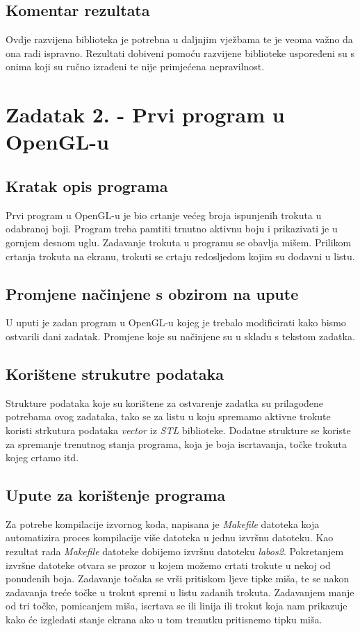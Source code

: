 \documentclass{report}
\begin{document}
\subsection{Komentar rezultata}
Ovdje razvijena biblioteka je potrebna u daljnjim vježbama te je veoma važno da ona radi ispravno.  Rezultati dobiveni pomoću razvijene biblioteke uspoređeni su s onima koji su ručno izrađeni te nije primjećena nepravilnost.
 
\section{Zadatak 2. - Prvi program u OpenGL-u}
\subsection{Kratak opis programa}
Prvi program u OpenGL-u je bio crtanje većeg broja ispunjenih trokuta u odabranoj boji. Program treba pamtiti trnutno aktivnu boju i prikazivati je u gornjem desnom uglu. Zadavanje trokuta u programu se obavlja mišem. Prilikom crtanja trokuta na ekranu, trokuti se crtaju redosljedom kojim su dodavni u listu.

\subsection{Promjene načinjene s obzirom na upute}
U uputi je zadan program u OpenGL-u kojeg je trebalo modificirati kako bismo ostvarili dani zadatak. Promjene koje su načinjene su u skladu s tekstom zadatka.

\subsection{Korištene strukutre podataka}
Strukture podataka koje su korištene za ostvarenje zadatka su prilagođene potrebama ovog zadataka, tako se za listu u koju spremamo aktivne trokute koristi strkutura podataka \textit{vector} iz \textit{STL} biblioteke. Dodatne strukture se koriste za spremanje trenutnog stanja programa, koja je boja iscrtavanja, točke trokuta kojeg crtamo itd.

\subsection{Upute za korištenje programa}
Za potrebe kompilacije izvornog koda, napisana je \textit{Makefile} datoteka koja automatizira proces kompilacije više datoteka u jednu izvršnu datoteku. Kao rezultat rada \textit{Makefile} datoteke dobijemo izvršnu datoteku \textit{labos2}. Pokretanjem izvršne datoteke otvara se prozor   u kojem možemo crtati trokute u nekoj od ponuđenih boja. Zadavanje točaka se vrši pritiskom ljeve tipke miša, te se nakon zadavanja treće točke u trokut spremi u listu zadanih trokuta. Zadavanjem manje od tri točke, pomicanjem miša, iscrtava se ili linija ili trokut koja nam prikazuje kako će izgledati stanje ekrana ako u tom trenutku pritisnemo tipku miša.
\end{document}
